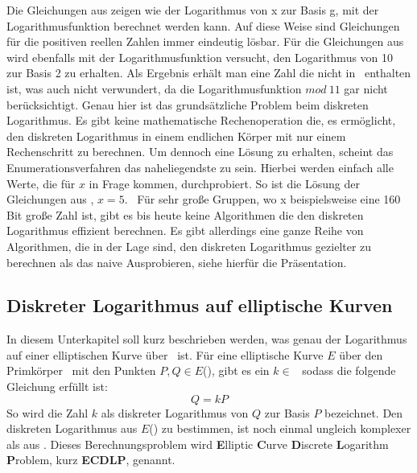 		Die Gleichungen aus  zeigen wie der Logarithmus von x zur Basis g, mit der Logarithmusfunktion berechnet werden kann. Auf diese Weise sind Gleichungen für die positiven reellen Zahlen  immer eindeutig lösbar. Für die Gleichungen aus  wird ebenfalls mit der Logarithmusfunktion versucht, den Logarithmus von 10 zur Basis 2 zu erhalten. Als Ergebnis erhält man eine Zahl die nicht in \myZPStern~enthalten ist, was auch nicht verwundert, da die Logarithmusfunktion $mod~11$ gar nicht berücksichtigt. Genau hier ist das grundsätzliche Problem beim diskreten Logarithmus. Es gibt keine mathematische Rechenoperation die, es ermöglicht, den diskreten Logarithmus in einem endlichen Körper mit nur einem Rechenschritt zu berechnen. Um dennoch eine Lösung zu erhalten, scheint das Enumerationsverfahren das naheliegendste zu sein. Hierbei werden einfach alle Werte, die für $x$ in Frage kommen, durchprobiert. So ist die Lösung der Gleichungen aus , $x = 5$.~\cite{DLP:ECDLP:Probleme:und:Loesungen} Für sehr große Gruppen, wo x beispielsweise eine 160 Bit große Zahl ist, gibt es bis heute keine Algorithmen die den diskreten Logarithmus effizient berechnen.\cite{Kryptografie:in:Theorie:und:Praxis} Es gibt allerdings eine ganze Reihe von Algorithmen, die in der Lage sind, den diskreten Logarithmus gezielter zu berechnen als das naive Ausprobieren, siehe hierfür die Präsentation.
		
		
		\subsection*{Diskreter Logarithmus auf elliptische Kurven}
			In diesem Unterkapitel soll kurz beschrieben werden, was genau der Logarithmus auf einer elliptischen Kurve über \myZPStern~ist. Für eine elliptische Kurve $E$ über den Primkörper \myZPStern~mit den Punkten $P, Q \in E$(\myZPStern), gibt es ein $k \in$ \myZPStern~sodass die folgende Gleichung erfüllt ist:
			\begin{displaymath}
				Q = kP
			\end{displaymath}
			So wird die Zahl $k$ als diskreter Logarithmus von $Q$ zur Basis $P$ bezeichnet. Den diskreten Logarithmus aus $E$(\myZPStern) zu bestimmen, ist noch einmal ungleich komplexer als aus \myZPStern. Dieses Berechnungsproblem wird \textbf{E}lliptic \textbf{C}urve \textbf{D}iscrete \textbf{L}ogarithm \textbf{P}roblem, kurz \textbf{ECDLP}, genannt.